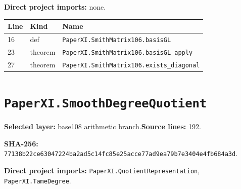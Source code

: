 \documentclass[10pt,oneside]{book}
\begin{document}
\textbf{Direct project imports:} none.

\begin{longtable}{@{}p{}p{}p{}@{}}\toprule Line&Kind&Name\\\midrule\endhead

16&def&\nolinkurl{PaperXI.SmithMatrix106.basisGL}\\

23&theorem&\nolinkurl{PaperXI.SmithMatrix106.basisGL_apply}\\

27&theorem&\nolinkurl{PaperXI.SmithMatrix106.exists_diagonal}\\

\bottomrule\end{longtable}

\section{\texorpdfstring{\nolinkurl{PaperXI.SmoothDegreeQuotient}}{PaperXI.SmoothDegreeQuotient}}\label{module:PaperXI.SmoothDegreeQuotient}

\textbf{Selected layer:} base108 arithmetic branch.\quad\textbf{Source lines:} 192.\par\textbf{SHA-256:} {\scriptsize\nolinkurl{77138b22ce63047224ba2ad5c14fc85e25acce77ad9ea79b7e3404e4fb684a3d}}.


\textbf{Direct project imports:} \nolinkurl{PaperXI.QuotientRepresentation}, \nolinkurl{PaperXI.TameDegree}.
\end{document}
